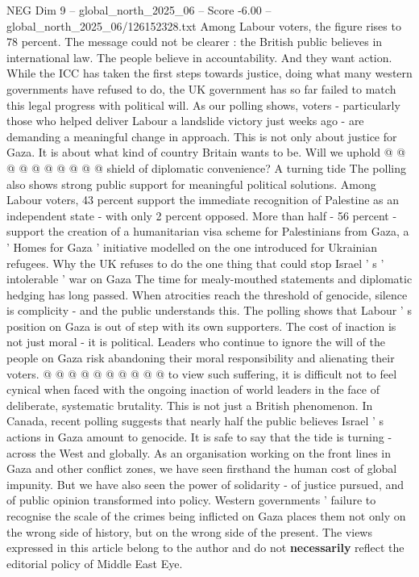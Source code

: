 \begin{textsample}{NEG Dim 9 – global\_north\_2025\_06 – Score -6.00 – global\_north\_2025\_06/126152328.txt}
Among Labour voters, the figure rises to 78 percent.
The message could not be clearer : the British public believes in international law.
The people believe in accountability.
And they want action.
While the ICC has taken the first steps towards justice, doing what many western governments have refused to do, the UK government has so far failed to match this legal progress with political will.
As our polling shows, voters - particularly those who helped deliver Labour a landslide victory just weeks ago - are demanding a meaningful change in approach.
This is not only about justice for Gaza.
It is about what kind of country Britain wants to be.
Will we uphold @ @ @ @ @ @ @ @ @ @ shield of diplomatic convenience?
A turning tide The polling also shows strong public support for meaningful political solutions.
Among Labour voters, 43 percent support the immediate recognition of Palestine as an independent state - with only 2 percent opposed.
More than half - 56 percent - support the creation of a humanitarian visa scheme for Palestinians from Gaza, a ' Homes for Gaza ' initiative modelled on the one introduced for Ukrainian refugees.
Why the UK refuses to do the one thing that could stop Israel ' s ' intolerable ' war on Gaza The time for mealy-mouthed statements and diplomatic hedging has long passed.
When atrocities reach the threshold of genocide, silence is complicity - and the public understands this.
The polling shows that Labour ' s position on Gaza is out of step with its own supporters.
The cost of inaction is not just moral - it is political.
Leaders who continue to ignore the will of the people on Gaza risk abandoning their moral responsibility and alienating their voters. @ @ @ @ @ @ @ @ @ @ to view such suffering, it is difficult not to feel cynical when faced with the ongoing inaction of world leaders in the face of deliberate, systematic brutality.
This is not just a British phenomenon.
In Canada, recent polling suggests that nearly half the public believes Israel ' s actions in Gaza amount to genocide.
It is safe to say that the tide is turning - across the West and globally.
As an organisation working on the front lines in Gaza and other conflict zones, we have seen firsthand the human cost of global impunity.
But we have also seen the power of solidarity - of justice pursued, and of public opinion transformed into policy.
Western governments ' failure to recognise the scale of the crimes being inflicted on Gaza places them not only on the wrong side of history, but on the wrong side of the present.
The views expressed in this article belong to the author and do not \textbf{necessarily} reflect the editorial policy of Middle East Eye.

\end{textsample}
